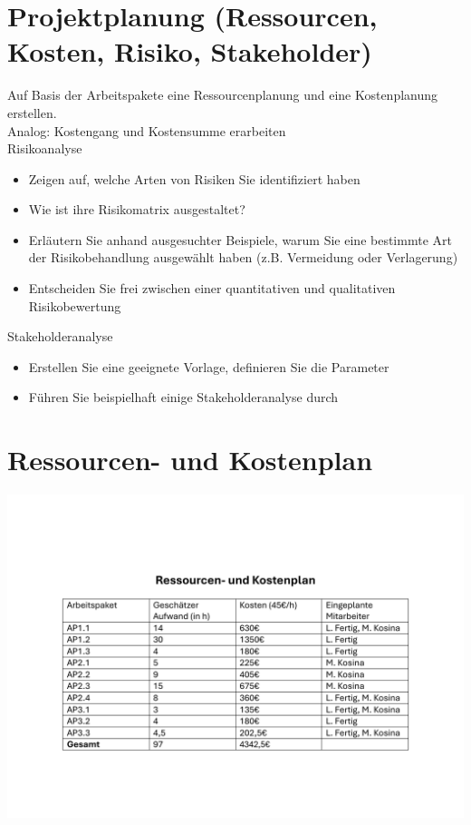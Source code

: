 \documentclass[12pt]{article}
\begin{document}
\section{Projektplanung (Ressourcen, Kosten, Risiko, Stakeholder)}
Auf Basis der Arbeitspakete eine Ressourcenplanung und eine Kostenplanung erstellen.\\
Analog: Kostengang und Kostensumme erarbeiten\\
Risikoanalyse
\begin{itemize}
	\item Zeigen auf, welche Arten von Risiken Sie identifiziert haben
	\item Wie ist ihre Risikomatrix ausgestaltet?
	\item Erläutern Sie anhand ausgesuchter Beispiele, warum Sie eine bestimmte Art der Risikobehandlung ausgewählt haben (z.B. Vermeidung oder Verlagerung)
\item Entscheiden Sie frei zwischen einer quantitativen und qualitativen Risikobewertung
\end{itemize}
Stakeholderanalyse
\begin{itemize}
	\item Erstellen Sie eine geeignete Vorlage, definieren Sie die Parameter
	\item Führen Sie beispielhaft einige Stakeholderanalyse durch
\end{itemize}

\section{Ressourcen- und Kostenplan}
\includegraphics[width=\textwidth]{Planungsdokumente/graphics/Ressourcenplan.pdf}
\end{document}
